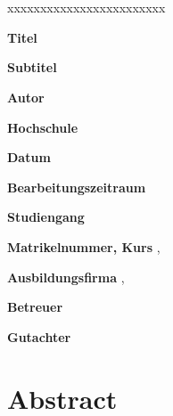 \section*{\reporttype}

\begin{xlist}{xxxxxxxxxxxxxxxxxxxxxxxx} 
  		\item[\textbf{Titel}]        			\reporttitle
		\item[\textbf{Subtitel}]          		\reportsubtitle
		\item[\textbf{Autor}]          			\student
		\item[\textbf{Hochschule}]          	\dhbw
		\item[\textbf{Datum}]          			\handoverdate
		\item[\textbf{Bearbeitungszeitraum}] 	\timerange
		\item[\textbf{Studiengang}]          	\studiengang
		\item[\textbf{Matrikelnummer, Kurs}]  	\matrikel, \kurs
		\item[\textbf{Ausbildungsfirma}]      	\company, \lokation
		\item[\textbf{Betreuer}]   				\tutor
		\item[\textbf{Gutachter}]            	\prof
\end{xlist}
 	
\section*{Abstract}


